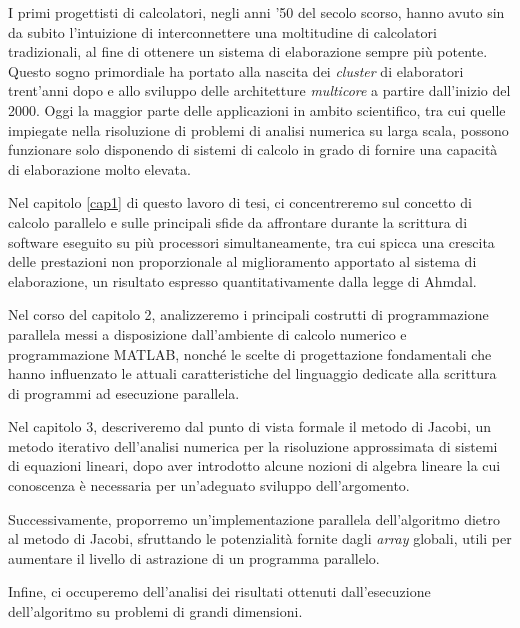 I primi progettisti di calcolatori, negli anni '50 del secolo scorso, hanno avuto sin da subito l'intuizione di interconnettere
una moltitudine di calcolatori tradizionali, al fine di ottenere un sistema di elaborazione sempre più potente.
Questo sogno primordiale ha portato alla nascita dei \textit{cluster} di elaboratori trent'anni dopo e allo sviluppo delle architetture
\textit{multicore} a partire dall'inizio del 2000.
Oggi la maggior parte delle applicazioni in ambito scientifico, tra cui quelle impiegate nella risoluzione di problemi di analisi numerica
su larga scala, possono funzionare solo disponendo di sistemi di calcolo in grado di fornire una capacità di elaborazione molto elevata.

\vspace*{0.5cm}
Nel capitolo \ref{cap1} di questo lavoro di tesi, ci concentreremo sul concetto di calcolo parallelo e sulle principali sfide da affrontare
durante la scrittura di software eseguito su più processori simultaneamente, tra cui spicca una crescita delle prestazioni non proporzionale
al miglioramento apportato al sistema di elaborazione, un risultato espresso quantitativamente dalla legge di Ahmdal.

\vspace*{0.5cm}
Nel corso del capitolo 2, analizzeremo i principali costrutti di programmazione parallela messi a disposizione dall’ambiente di calcolo numerico
e programmazione MATLAB\textsuperscript{\textregistered}, nonché le scelte di progettazione fondamentali che hanno influenzato
le attuali caratteristiche del linguaggio dedicate alla scrittura di programmi ad esecuzione parallela.

\vspace*{0.5cm}
Nel capitolo 3, descriveremo dal punto di vista formale il metodo di Jacobi, un metodo iterativo dell’analisi numerica per la risoluzione
approssimata di sistemi di equazioni lineari, dopo aver introdotto alcune nozioni di algebra lineare la cui conoscenza è necessaria per un'adeguato
sviluppo dell'argomento.

Successivamente, proporremo un’implementazione parallela dell'algoritmo dietro al metodo di Jacobi, sfruttando le potenzialità fornite
dagli \textit{array} globali, utili per aumentare il livello di astrazione di un programma parallelo.

Infine, ci occuperemo dell’analisi dei risultati ottenuti dall’esecuzione dell’algoritmo su problemi di grandi dimensioni.
